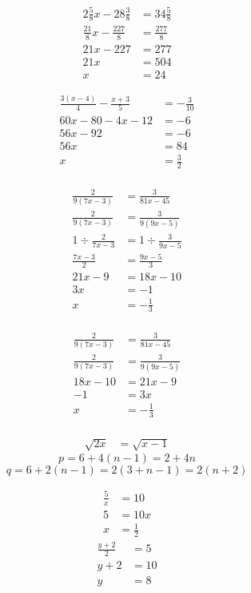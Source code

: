 \documentclass[]{article}
\begin{document}
\[\begin{aligned}
    2\frac58x-28\frac38&=34\frac58\\
    \frac{21}8x-\frac{227}8&=\frac{277}8\\
    21x-227&=277\\
    21x&=504\\
    x&=\boxed{24}
\end{aligned}\]

\[\begin{aligned}
    \frac{3(x-4)}4-\frac{x+3}5&=-\frac3{10}\\
    60x-80-4x-12&=-6\\
    56x-92&=-6\\
    56x&=84\\
    x&=\boxed{\frac32}\\
\end{aligned}\]

\newpage
\[\begin{aligned}
    \frac2{9(7x-3)}&=\frac3{81x-45}\\
    \frac2{9(7x-3)}&=\frac3{9(9x-5)}\\
    1\div\frac2{7x-3}&=1\div\frac3{9x-5}\\
    \frac{7x-3}2&=\frac{9x-5}3\\
    21x-9&=18x-10\\
    3x&=-1\\
    x&=\boxed{-\frac13}\\
\end{aligned}\]

\[\begin{aligned}
    \frac2{9(7x-3)}&=\frac3{81x-45}\\
    \frac2{9(7x-3)}&=\frac3{9(9x-5)}\\
    18x-10&=21x-9\\
    -1&=3x\\
    x&=\boxed{-\frac13}\\
\end{aligned}\]

\[\begin{aligned}
    \sqrt{2x}&=\sqrt{x-1}
\end{aligned}\]
\newpage
\[p=6+4(n-1)=2+4n\]
\[q=6+2(n-1)=2(3+n-1)=2(n+2)\]

\[\begin{aligned}
    \frac5x&=10\\
    5&=10x\\
    x&=\frac12
\end{aligned}\]
\[\begin{aligned}
    \frac{y+2}2&=5\\
    y+2&=10\\
    y&=8
\end{aligned}\]
\\
\end{document}
